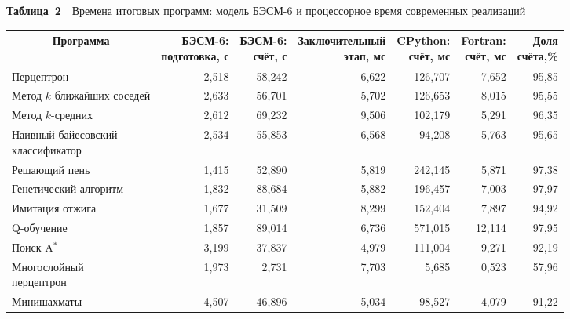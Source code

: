 \documentclass[a4paper,12pt]{article}
\begin{document}
\begin{table}[!ht]\small\tabcolsep=2.5pt
\noindent\textbf{Таблица~2}\ \ Времена итоговых программ: модель БЭСМ-6 и процессорное время современных реализаций\par\vspace{4pt}
\centering
\begin{tabular}{|l|r|r|r|r|r|r|}
\hline
\multicolumn{1}{|c|}{Программа} & \hd{БЭСМ-6:\\подготовка, с} & \hd{БЭСМ-6:\\счёт, с} & \hd{Заключительный\\этап, мс} & \hd{CPython:\\счёт, мс} & \hd{Fortran:\\счёт, мс} & \hd{Доля\\счёта,\%} \\
\hline
Перцептрон & 2,518 & 58,242 & 6,622 & 126,707 & 7,652 & 95,85 \\ \hline
\hl{Метод $k$ ближайших\\соседей} & 2,633 & 56,701 & 5,702 & 126,653 & 8,015 & 95,55 \\ \hline
Метод $k$-средних & 2,612 & 69,232 & 9,506 & 102,179 & 5,291 & 96,35 \\ \hline
\hl{Наивный байесовский\\классификатор} & 2,534 & 55,853 & 6,568 & 94,208 & 5,763 & 95,65 \\ \hline
Решающий пень & 1,415 & 52,890 & 5,819 & 242,145 & 5,871 & 97,38 \\ \hline
Генетический алгоритм & 1,832 & 88,684 & 5,882 & 196,457 & 7,003 & 97,97 \\ \hline
Имитация отжига & 1,677 & 31,509 & 8,299 & 152,404 & 7,897 & 94,92 \\ \hline
Q-обучение & 1,857 & 89,014 & 6,736 & 571,015 & 12,114 & 97,95 \\ \hline
Поиск A$^*$ & 3,199 & 37,837 & 4,979 & 111,004 & 9,271 & 92,19 \\ \hline
\hl{Многослойный\\перцептрон} & 1,973 & 2,731 & 7,703 & 5,685 & 0,523 & 57,96 \\ \hline
Минишахматы & 4,507 & 46,896 & 5,034 & 98,527 & 4,079 & 91,22 \\ \hline
\end{tabular}
\par\smallskip{}
\end{table}
\end{document}
